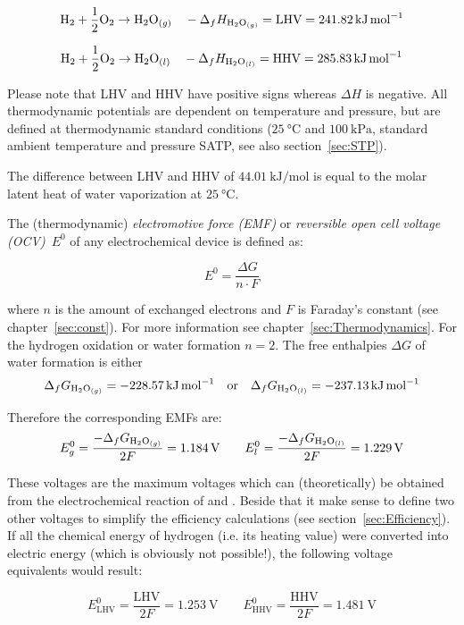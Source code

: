 \documentclass[11pt,a4paper,english,twoside]{scrreprt}
\begin{document}
\[\ce{H2} + \frac 12 \ce{O2} \to \ce{H2O}_{(g)} \quad -\Delta_f H_{\ce{H2O}_{(g)} } =\text{LHV}=\SI{241.82}{\kilo\joule\per\mole}\]

\[\ce{H2} + \frac 12 \ce{O2} \to \ce{H2O}_{(l)} \quad -\Delta_f H_{\ce{H2O}_{(l)} } =\text{HHV}=\SI{285.83}{\kilo\joule\per\mole}\]

Please note that LHV and HHV have positive signs whereas $\Delta H$ is negative. All thermodynamic potentials are dependent on temperature and pressure, but are defined at thermodynamic standard conditions ($\SI{25}{\degreeCelsius}$ and $\SI{100}{\kilo\pascal}$, standard ambient temperature and pressure SATP, see also section~\ref{sec:STP}).

The difference between LHV and HHV of $\SI{44.01}{\kilo\joule\per\mole}$ is equal to the molar latent heat of water vaporization at $\SI{25}{\degreeCelsius}$.

The (thermodynamic) \textit{electromotive force (EMF)} or \textit{reversible open cell voltage (OCV)}~$E^{0}$ of any electrochemical device is defined as:

\[E^{0} =\frac{\Delta G}{n\cdot F} \]

where $n$ is the amount of exchanged electrons and $F$ is Faraday's constant (see chapter~\ref{sec:const}). For more information see chapter~\ref{sec:Thermodynamics}. For the hydrogen oxidation or water formation $n=2$. The free enthalpies $\Delta G$ of water formation is either 
\[
\Delta_f G_{\ce{H2O}_{(g)} } =\SI{-228.57}{\kilo\joule\per\mole} \quad \mbox{or} \quad
\Delta_f G_{\ce{H2O}_{(l)} } =\SI{-237.13}{\kilo\joule\per\mole}
\]

Therefore the corresponding EMFs are:
\begin{equation}
  \label{eqn:E_dG}
  E_{g}^{0} =\frac{-\Delta_f G_{\ce{H2O}_{(g)}}}{2F} =\SI{1.184}{\volt} \qquad
  E_{l}^{0} =\frac{-\Delta_f G_{\ce{H2O}_{(l)}}}{2F} =\SI{1.229}{\volt}
\end{equation}

These voltages are the maximum voltages which can (theoretically) be obtained from the electrochemical reaction of  and . Beside that it make sense to define two other voltages to simplify the efficiency calculations (see section~\ref{sec:Efficiency}). If all the chemical energy of hydrogen (i.e. its heating value) were converted into electric energy (which is obviously not possible!), the following voltage equivalents would result:

\begin{equation}
  \label{eqn:E_dH}
  E_\text{LHV}^{0} =\frac{\text{LHV}}{2F} =\SI{1.253}{\volt} \qquad
  E_\text{HHV}^{0} =\frac{\text{HHV}}{2F} =\SI{1.481}{\volt}
\end{equation}
\end{document}
